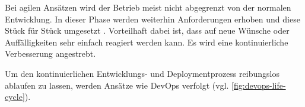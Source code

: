 	Bei agilen Ansätzen wird der Betrieb meist nicht abgegrenzt von der normalen Entwicklung. In dieser Phase werden weiterhin Anforderungen erhoben und diese Stück für Stück umgesetzt \cite{WaterfallVsVModelVsAgile}. Vorteilhaft dabei ist, dass auf neue Wünsche oder Auffälligkeiten sehr einfach reagiert werden kann. Es wird eine kontinuierliche Verbesserung angestrebt.
	
	Um den kontinuierlichen Entwicklungs- und Deploymentprozess reibungslos ablaufen zu lassen, werden Ansätze wie DevOps \cite{DevOps} verfolgt (vgl. \autoref{fig:devops-life-cycle}).